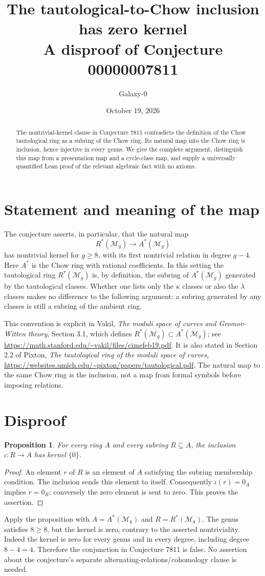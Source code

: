 \documentclass[11pt]{article}
\title{The tautological-to-Chow inclusion has zero kernel\\A disproof of Conjecture 00000007811}
\author{Galaxy-0}\date{October 19, 2026}
\newtheorem{proposition}{Proposition}
\begin{document}
\maketitle
\begin{abstract}
The nontrivial-kernel clause in Conjecture 7811 contradicts the definition of the Chow tautological ring as a subring of the Chow ring. Its natural map into the Chow ring is inclusion, hence injective in every genus. We give the complete argument, distinguish this map from a presentation map and a cycle-class map, and supply a universally quantified Lean proof of the relevant algebraic fact with no axioms.
\end{abstract}
\section{Statement and meaning of the map}
The conjecture asserts, in particular, that the natural map
\[
R^*(\mathcal M_g)\longrightarrow A^*(\mathcal M_g)
\]
has nontrivial kernel for $g\ge8$, with its first nontrivial relation in degree $g-4$.
Here $A^*$ is the Chow ring with rational coefficients. In this setting the tautological ring $R^*(\mathcal M_g)$ is, by definition, the subring of $A^*(\mathcal M_g)$ generated by the tautological classes. Whether one lists only the $\kappa$ classes or also the $\lambda$ classes makes no difference to the following argument: a subring generated by any classes is still a subring of the ambient ring.

This convention is explicit in Vakil, \emph{The moduli space of curves and Gromov-Witten theory}, Section 3.1, which defines $R^*(\mathcal M_g)\subset A^*(\mathcal M_g)$; see \url{https://math.stanford.edu/~vakil/files/cimefeb19.pdf}. It is also stated in Section 2.2 of Pixton, \emph{The tautological ring of the moduli space of curves}, \url{https://websites.umich.edu/~pixton/papers/tautological.pdf}. The natural map to the same Chow ring is the inclusion, not a map from formal symbols before imposing relations.

\section{Disproof}
\begin{proposition}
For every ring $A$ and every subring $R\subseteq A$, the inclusion $\iota:R\to A$ has kernel $\{0\}$.
\end{proposition}
\begin{proof}
An element $r$ of $R$ is an element of $A$ satisfying the subring membership condition. The inclusion sends this element to itself. Consequently $\iota(r)=0_A$ implies $r=0_R$; conversely the zero element is sent to zero. This proves the assertion.
\end{proof}
Apply the proposition with $A=A^*(\mathcal M_8)$ and $R=R^*(\mathcal M_8)$. The genus satisfies $8\ge8$, but the kernel is zero, contrary to the asserted nontriviality. Indeed the kernel is zero for every genus and in every degree, including degree $8-4=4$. Therefore the conjunction in Conjecture 7811 is false. No assertion about the conjecture's separate alternating-relations/cohomology clause is needed.
\end{document}

